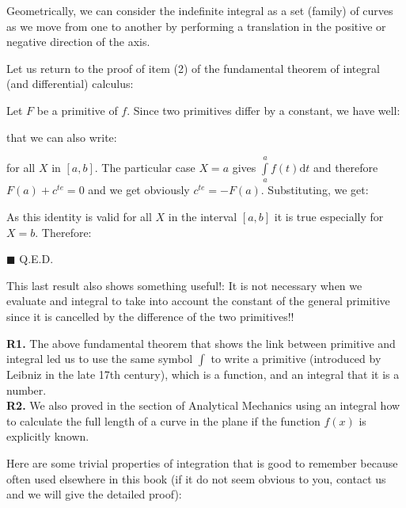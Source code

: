 	Geometrically, we can consider the indefinite integral as a set (family) of curves as we move from one to another by performing a translation in the positive or negative direction of the axis.
	
	Let us return to the proof of item (2) of the fundamental theorem of integral (and differential) calculus:
	\begin{dem}
	Let $F$ be a primitive of $f$. Since two primitives differ by a constant, we have well:
	
	that we can also write:
	
	for all $X$ in $[a, b]$. The particular case $X=a$ gives $\int\limits_a^a f(t)\mathrm{d}t$ and therefore $F(a)+c^{te}=0$ and we get obviously $c^{te}=-F(a)$. Substituting, we get:
	
	As this identity is valid for all $X$ in the interval $[a,b]$ it is true especially for $X=b$. Therefore:
	
	\begin{flushright}
		$\blacksquare$  Q.E.D.
	\end{flushright}
	\end{dem}
	This last result also shows something useful!: It is not necessary when we evaluate and integral to take into account the constant of the general primitive since it is cancelled by the difference of the two primitives!!
	\begin{tcolorbox}[title=Remarks,colframe=black,arc=10pt]
	\textbf{R1.} The above fundamental theorem that shows the link between primitive and integral led us to use the same symbol $\int$ to write a primitive (introduced by Leibniz in the late 17th century), which is a function, and an integral that it is a number.\\
	
	\textbf{R2.} We also proved in the section of Analytical Mechanics using an integral how to calculate the full length of a curve in the plane if the function $f(x)$ is explicitly known.
	\end{tcolorbox}
	Here are some trivial properties of integration that is good to remember because often used elsewhere in this book (if it do not seem obvious to you, contact us and we will give the detailed proof):
